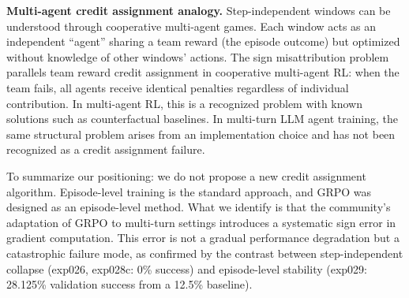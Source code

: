 \textbf{Multi-agent credit assignment analogy.} Step-independent windows can be understood through cooperative multi-agent games. Each window acts as an independent ``agent'' sharing a team reward (the episode outcome) but optimized without knowledge of other windows' actions. The sign misattribution problem parallels team reward credit assignment in cooperative multi-agent RL: when the team fails, all agents receive identical penalties regardless of individual contribution. In multi-agent RL, this is a recognized problem with known solutions such as counterfactual baselines. In multi-turn LLM agent training, the same structural problem arises from an implementation choice and has not been recognized as a credit assignment failure.

To summarize our positioning: we do not propose a new credit assignment algorithm. Episode-level training is the standard approach, and GRPO was designed as an episode-level method. What we identify is that the community's adaptation of GRPO to multi-turn settings introduces a systematic sign error in gradient computation. This error is not a gradual performance degradation but a catastrophic failure mode, as confirmed by the contrast between step-independent collapse (exp026, exp028c: 0\% success) and episode-level stability (exp029: 28.125\% validation success from a 12.5\% baseline).
